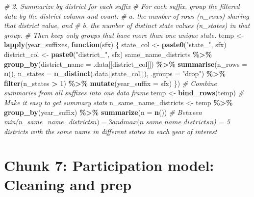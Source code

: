 \documentclass[
]{article}
\newenvironment{Shaded}{\begin{snugshade}}{\end{snugshade}}
\newcommand{\AttributeTok}[1]{\textcolor[rgb]{0.13,0.29,0.53}{#1}}
\newcommand{\CommentTok}[1]{\textcolor[rgb]{0.56,0.35,0.01}{\textit{#1}}}
\newcommand{\ControlFlowTok}[1]{\textcolor[rgb]{0.13,0.29,0.53}{\textbf{#1}}}
\newcommand{\DecValTok}[1]{\textcolor[rgb]{0.00,0.00,0.81}{#1}}
\newcommand{\FunctionTok}[1]{\textcolor[rgb]{0.13,0.29,0.53}{\textbf{#1}}}
\newcommand{\NormalTok}[1]{#1}
\newcommand{\OtherTok}[1]{\textcolor[rgb]{0.56,0.35,0.01}{#1}}
\newcommand{\SpecialCharTok}[1]{\textcolor[rgb]{0.81,0.36,0.00}{\textbf{#1}}}
\newcommand{\StringTok}[1]{\textcolor[rgb]{0.31,0.60,0.02}{#1}}
\begin{document}
\begin{Shaded}
\begin{Highlighting}[]
\CommentTok{\# 2. Summarize by district for each suffix}
\CommentTok{\# For each suffix, group the filtered data by the district column and count:}
\CommentTok{\# a. the number of rows (n\_rows) sharing that district value, and }
\CommentTok{\# b. the number of distinct state values (n\_states) in that group.}
\CommentTok{\# Then keep only groups that have more than one unique state.}
\NormalTok{temp }\OtherTok{\textless{}{-}} \FunctionTok{lapply}\NormalTok{(year\_suffixes, }\ControlFlowTok{function}\NormalTok{(sfx) \{}
\NormalTok{  state\_col }\OtherTok{\textless{}{-}} \FunctionTok{paste0}\NormalTok{(}\StringTok{"state\_"}\NormalTok{, sfx)}
\NormalTok{  district\_col }\OtherTok{\textless{}{-}} \FunctionTok{paste0}\NormalTok{(}\StringTok{"district\_"}\NormalTok{, sfx)}
\NormalTok{  same\_name\_districts }\SpecialCharTok{\%\textgreater{}\%}
    \FunctionTok{group\_by}\NormalTok{(}\AttributeTok{district\_name =}\NormalTok{ .data[[district\_col]]) }\SpecialCharTok{\%\textgreater{}\%}
    \FunctionTok{summarise}\NormalTok{(}\AttributeTok{n\_rows =} \FunctionTok{n}\NormalTok{(),}
              \AttributeTok{n\_states =} \FunctionTok{n\_distinct}\NormalTok{(.data[[state\_col]]),}
              \AttributeTok{.groups =} \StringTok{"drop"}\NormalTok{) }\SpecialCharTok{\%\textgreater{}\%}
    \FunctionTok{filter}\NormalTok{(n\_states }\SpecialCharTok{\textgreater{}} \DecValTok{1}\NormalTok{) }\SpecialCharTok{\%\textgreater{}\%}
    \FunctionTok{mutate}\NormalTok{(}\AttributeTok{year\_suffix =}\NormalTok{ sfx)}
\NormalTok{\})}
\CommentTok{\# Combine summaries from all suffixes into one data frame}
\NormalTok{temp }\OtherTok{\textless{}{-}} \FunctionTok{bind\_rows}\NormalTok{(temp)}
\CommentTok{\# Make it easy to get summary stats}
\NormalTok{n\_same\_name\_districts }\OtherTok{\textless{}{-}}\NormalTok{ temp }\SpecialCharTok{\%\textgreater{}\%} 
    \FunctionTok{group\_by}\NormalTok{(year\_suffix) }\SpecialCharTok{\%\textgreater{}\%} 
    \FunctionTok{summarize}\NormalTok{(}\AttributeTok{n =} \FunctionTok{n}\NormalTok{())}
\CommentTok{\# Between min(n\_same\_name\_districts$n) = 3 and max(n\_same\_name\_districts$n) = 5 districts with the same name in different states in each year of interest}
\end{Highlighting}
\end{Shaded}

\section*{Chunk 7: Participation model: Cleaning and prep}\label{chunk-7-participation-model-cleaning-and-prep}
\end{document}
